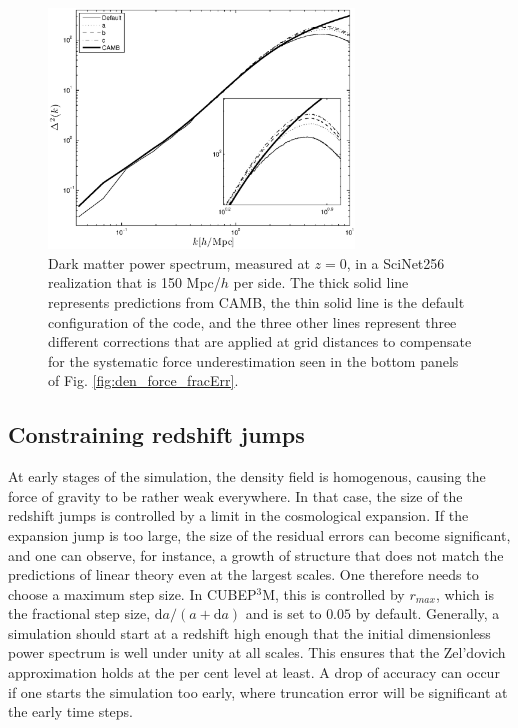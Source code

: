 \documentclass[useAMS,usenatbib]{mn2e}
\begin{document}

\begin{figure}%
  \begin{center}
    \includegraphics[width=3.2in]{graphs/power_fudge.eps}
  \caption{Dark matter power spectrum, measured at $z=0$, in a SciNet256 realization that is 150 Mpc/$h$ per side. 
  The thick solid line represents predictions from {\small CAMB}, the thin solid line is the default configuration of the code, and the three other lines represent
  three different corrections that are applied at grid distances to compensate for the systematic force underestimation seen in the bottom panels of Fig. \ref{fig:den_force_fracErr}. }
\end{center}
\end{figure}


\subsection{Constraining redshift jumps}
\label{subsec:z_jumps}


At early stages of the simulation, the density field is homogenous, causing the force of gravity to be
rather weak everywhere. In that case, the size of the redshift jumps is controlled by a limit in the cosmological expansion.
If the expansion jump is too large, the size of the residual errors can become significant, and one can observe, for instance,
a growth of structure that does not match the predictions of  linear theory even at the largest scales.
One therefore needs to choose a maximum step size. In {\small CUBEP$^3$M}, this is controlled by $r_{max}$, which is the fractional step size,
$\mbox{d}a/(a + \mbox{d}a)$ and is set to $0.05$ by default.  Generally, a simulation should start at a redshift high enough that
the initial dimensionless power spectrum is well under unity at all scales. This ensures that the Zel'dovich approximation
 holds at the per cent level at least. A drop of accuracy can occur if one starts the simulation too early, where
 truncation error will be significant at the early time steps.
\end{document}
